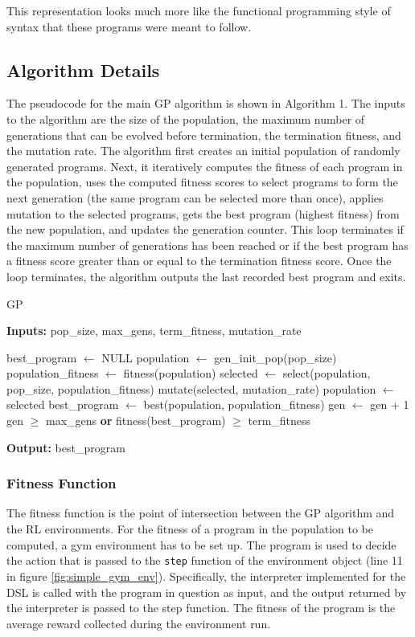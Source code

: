 This representation looks much more like the functional programming style of syntax that these programs were meant to follow.

\subsection{Algorithm Details}
The pseudocode for the main GP algorithm is shown in Algorithm 1. The inputs to the algorithm are the size of the population, the maximum number of generations that can be evolved before termination, the termination fitness, and the mutation rate. The algorithm first creates an initial population of randomly generated programs. Next, it iteratively computes the fitness of each program in the population, uses the computed fitness scores to select programs to form the next generation (the same program can be selected more than once), applies mutation to the selected programs, gets the best program (highest fitness) from the new population, and updates the generation counter. This loop terminates if the maximum number of generations has been reached or if the best program has a fitness score greater than or equal to the termination fitness score. Once the loop terminates, the algorithm outputs the last recorded best program and exits.

\begin{algorithm}[ht]
	\caption{GP}
	\textbf{Inputs:} pop\_size, max\_gens, term\_fitness, mutation\_rate
	\begin{algorithmic}[1]
	    \State best\_program $\leftarrow$ NULL
	    \State population $\leftarrow$ gen\_init\_pop(pop\_size)
	    \Repeat
	        \State population\_fitness $\leftarrow$ fitness(population)
	        \State selected $\leftarrow$ select(population, pop\_size, population\_fitness)
	        \State mutate(selected, mutation\_rate)
	        \State population $\leftarrow$ selected
	        \State best\_program $\leftarrow$ best(population, population\_fitness)
	        \State gen $\leftarrow$ gen + 1
	    \Until gen $\geq$ max\_gens \textbf{or} fitness(best\_program) $\geq$ term\_fitness
	\end{algorithmic}
	\textbf{Output:} best\_program
\end{algorithm}

\subsubsection{Fitness Function}
The fitness function is the point of intersection between the GP algorithm and the RL environments. For the fitness of a program in the population to be computed, a gym environment has to be set up. The program is used to decide the action that is passed to the \verb+step+ function of the environment object (line 11 in figure \ref{fig:simple_gym_env}). Specifically, the interpreter implemented for the DSL is called with the program in question as input, and the output returned by the interpreter is passed to the step function. The fitness of the program is the average reward collected during the environment run.

